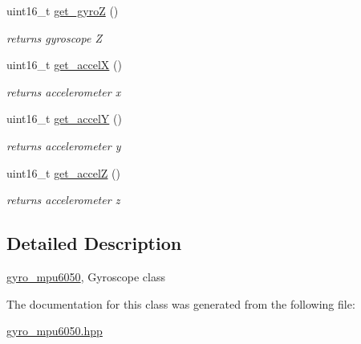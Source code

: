 \begin{DoxyCompactItemize}
uint16\+\_\+t \hyperlink{classgyro__mpu6050_a955e5fc73fb60db70d9fd21d9845041c}{get\+\_\+gyroZ} ()
\begin{DoxyCompactList}\small\item\em returns gyroscope Z \end{DoxyCompactList}\item 
\mbox{\label{classgyro__mpu6050_ac121cf3b8dcc2655585a17c587ed7250}} 
uint16\+\_\+t \hyperlink{classgyro__mpu6050_ac121cf3b8dcc2655585a17c587ed7250}{get\+\_\+accelX} ()
\begin{DoxyCompactList}\small\item\em returns accelerometer x \end{DoxyCompactList}\item 
\mbox{\label{classgyro__mpu6050_ab0ab2bbd7875ccad4c244b6496764f35}} 
uint16\+\_\+t \hyperlink{classgyro__mpu6050_ab0ab2bbd7875ccad4c244b6496764f35}{get\+\_\+accelY} ()
\begin{DoxyCompactList}\small\item\em returns accelerometer y \end{DoxyCompactList}\item 
\mbox{\label{classgyro__mpu6050_af90c1ec0103b8c7b168f32779302b96e}} 
uint16\+\_\+t \hyperlink{classgyro__mpu6050_af90c1ec0103b8c7b168f32779302b96e}{get\+\_\+accelZ} ()
\begin{DoxyCompactList}\small\item\em returns accelerometer z \end{DoxyCompactList}\end{DoxyCompactItemize}


\subsection{Detailed Description}
\hyperlink{classgyro__mpu6050}{gyro\+\_\+mpu6050}, Gyroscope class 

The documentation for this class was generated from the following file\+:\begin{DoxyCompactItemize}
\item 
\hyperlink{gyro__mpu6050_8hpp}{gyro\+\_\+mpu6050.\+hpp}\end{DoxyCompactItemize}
